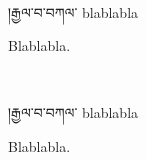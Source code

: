 \documentclass{upecha}
\begin{document}

\newpage
\null
\ClearShipoutPicture %
\newpage
{}

\makeatletter
{}
\makeatother

\pechaintrolayout

\oddright[0]{{\bispage}}
\evenright[0]{{\bispage}}
\oddleft[0]{}

\ 

\vskip 2mm
།རྒྱལ་བ་བཀལ་ blablabla

Blablabla.

\newpage

\ 

\vskip 2mm
།རྒྱལ་བ་བཀལ་ blablabla

Blablabla.
\end{document}
